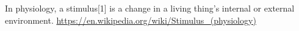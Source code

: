 \documentclass[a4paper]{standalone}
\begin{document}
    In physiology, a stimulus[1] is a change in a living thing's internal or external environment.
    \url{https://en.wikipedia.org/wiki/Stimulus_(physiology)}
\end{document}
